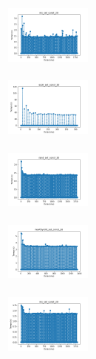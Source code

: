 \begin{figure}[H]    
    \centering
    \begin{subfigure}
        \centering
        \includegraphics[width=0.234\textwidth]{img/am10/iris_set_const_20_949004259_time.png}
    \end{subfigure}
    \hfill
    \begin{subfigure}
        \centering
        \includegraphics[width=0.234\textwidth]{img/am10/ecoli_set_const_20_949004259_time.png}
    \end{subfigure}
    \hfill
    \begin{subfigure}
        \centering
        \includegraphics[width=0.234\textwidth]{img/am10/rand_set_const_20_949004259_time.png}
    \end{subfigure}
    \hfill
    \begin{subfigure}
        \centering
        \includegraphics[width=0.234\textwidth]{img/am10/newthyroid_set_const_20_949004259_time.png}
    \end{subfigure}
    \hfill
    \begin{subfigure}
        \centering
        \includegraphics[width=0.234\textwidth]{img/am10/iris_set_const_20_589741062_time.png}
    \end{subfigure}
    \hfill

\end{figure}
